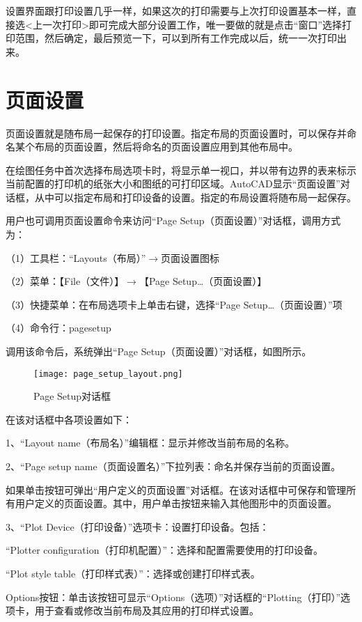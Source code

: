 设置界面跟打印设置几乎一样，如果这次的打印需要与上次打印设置基本一样，直接选<上一次打印>即可完成大部分设置工作，唯一要做的就是点击“窗口”选择打印范围，然后确定，最后预览一下，可以到所有工作完成以后，统一一次打印出来。

\chapter{页面设置}

页面设置就是随布局一起保存的打印设置。指定布局的页面设置时，可以保存并命名某个布局的页面设置，然后将命名的页面设置应用到其他布局中。

在绘图任务中首次选择布局选项卡时，将显示单一视口，并以带有边界的表来标示当前配置的打印机的纸张大小和图纸的可打印区域。AutoCAD显示“页面设置”对话框，从中可以指定布局和打印设备的设置。指定的布局设置将随布局一起保存。

用户也可调用页面设置命令来访问“Page Setup（页面设置）”对话框，调用方式为：

（1）工具栏：“Layouts（布局）”$\to$页面设置图标

（2）菜单：【File（文件）】$\to$【Page Setup…（页面设置）】

（3）快捷菜单：在布局选项卡上单击右键，选择“Page Setup…（页面设置）”项

（4）命令行：pagesetup

调用该命令后，系统弹出“Page Setup（页面设置）”对话框，如图所示。

\begin{figure}[htbp]
\centering
\texttt{[image: page\_setup\_layout.png]}
\caption{Page Setup对话框}
\end{figure}


在该对话框中各项设置如下：

1、“Layout name（布局名）”编辑框：显示并修改当前布局的名称。

2、“Page setup name（页面设置名）”下拉列表：命名并保存当前的页面设置。

如果单击按钮可弹出“用户定义的页面设置”对话框。在该对话框中可保存和管理所有用户定义的页面设置。其中，用户单击按钮来输入其他图形中的页面设置。

3、“Plot Device（打印设备）”选项卡：设置打印设备。包括：

\begin{compactitem}
\item “Plotter configuration（打印机配置）”：选择和配置需要使用的打印设备。
\item “Plot style table（打印样式表）”：选择或创建打印样式表。
\item Options按钮：单击该按钮可显示“Options（选项）”对话框的“Plotting（打印）”选项卡，用于查看或修改当前布局及其应用的打印样式设置。
\end{compactitem}

